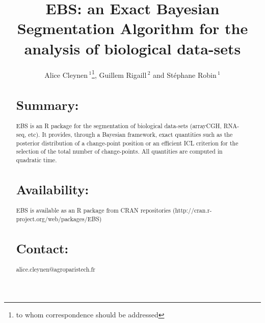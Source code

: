 \documentclass{bioinfo}
\begin{document}

\title[short Title]{EBS: an Exact Bayesian Segmentation Algorithm for
  the analysis of biological data-sets}

\author[Sample \textit{et~al}]{Alice Cleynen\,$^{1}$\footnote{to whom correspondence should be addressed}, Guillem
  Rigaill\,$^{2}$ and St\'{e}phane Robin\,$^{1}$}



\address{$^{1}$AgroParisTech, 16 rue Claude Bernard, 75231 Paris Cedex
  05, France \\ 
$^{2}$URGV, INRA-CNRS-Univ. Evry, 2 Rue Gaston
  Cr\'{e}mieux, 91057 Evry Cedex, France}



\maketitle


\begin{abstract}

\section{Summary:}
 EBS is an R package for the segmentation of biological data-sets
 (arrayCGH, RNA-seq, etc). It provides, through a Bayesian framework,
 exact quantities such as the posterior distribution of a change-point
 position or an efficient ICL criterion for the selection of the total
 number of change-points. All quantities are computed in quadratic
 time.


\section{Availability:}
EBS is available as an R package from CRAN repositories
(http://cran.r-project.org/web/packages/EBS)


\section{Contact:} alice.cleynen@agroparistech.fr
\end{abstract}
\end{document}
